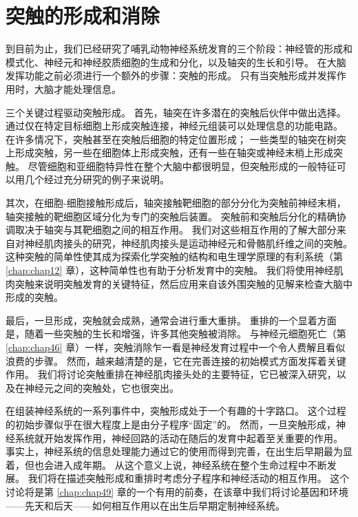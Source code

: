 \chapter{突触的形成和消除} \label{chap:chap48}

到目前为止，我们已经研究了哺乳动物神经系统发育的三个阶段：神经管的形成和模式化、神经元和神经胶质细胞的生成和分化，以及轴突的生长和引导。
在大脑发挥功能之前必须进行一个额外的步骤：突触的形成。
只有当突触形成并发挥作用时，大脑才能处理信息。


三个关键过程驱动突触形成。
首先，轴突在许多潜在的突触后伙伴中做出选择。
通过仅在特定目标细胞上形成突触连接，神经元组装可以处理信息的功能电路。
在许多情况下，突触甚至在突触后细胞的特定位置形成；
一些类型的轴突在树突上形成突触，另一些在细胞体上形成突触，还有一些在轴突或神经末梢上形成突触。
尽管细胞和亚细胞特异性在整个大脑中都很明显，但突触形成的一般特征可以用几个经过充分研究的例子来说明。


其次，在细胞-细胞接触形成后，轴突接触靶细胞的部分分化为突触前神经末梢，轴突接触的靶细胞区域分化为专门的突触后装置。
突触前和突触后分化的精确协调取决于轴突与其靶细胞之间的相互作用。
我们对这些相互作用的了解大部分来自对神经肌肉接头的研究，神经肌肉接头是运动神经元和骨骼肌纤维之间的突触。
这种突触的简单性使其成为探索化学突触的结构和电生理学原理的有利系统（第 \ref{chap:chap12} 章），这种简单性也有助于分析发育中的突触。
我们将使用神经肌肉突触来说明突触发育的关键特征，然后应用来自该外围突触的见解来检查大脑中形成的突触。


最后，一旦形成，突触就会成熟，通常会进行重大重排。
重排的一个显着方面是，随着一些突触的生长和增强，许多其他突触被消除。
与神经元细胞死亡（第 \ref{chap:chap46} 章）一样，突触消除乍一看是神经发育过程中一个令人费解且看似浪费的步骤。
然而，越来越清楚的是，它在完善连接的初始模式方面发挥着关键作用。
我们将讨论突触重排在神经肌肉接头处的主要特征，它已被深入研究，以及在神经元之间的突触处，它也很突出。


在组装神经系统的一系列事件中，突触形成处于一个有趣的十字路口。
这个过程的初始步骤似乎在很大程度上是由分子程序“固定”的。
然而，一旦突触形成，神经系统就开始发挥作用，神经回路的活动在随后的发育中起着至关重要的作用。
事实上，神经系统的信息处理能力通过它的使用而得到完善，在出生后早期最为显着，但也会进入成年期。
从这个意义上说，神经系统在整个生命过程中不断发展。 我们将在描述突触形成和重排时考虑分子程序和神经活动的相互作用。
这个讨论将是第 \ref{chap:chap49} 章的一个有用的前奏，在该章中我们将讨论基因和环境——先天和后天——如何相互作用以在出生后早期定制神经系统。



